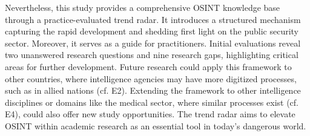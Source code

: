 \documentclass[10pt]{article}
\begin{document}
Nevertheless, this study provides a comprehensive OSINT knowledge base through a practice-evaluated trend radar. It introduces a structured mechanism capturing the rapid development and shedding first light on the public security sector. Moreover, it serves as a guide for practitioners. Initial evaluations reveal two unanswered research questions and nine research gaps, highlighting critical areas for further development. Future research could apply this framework to other countries, where intelligence agencies may have more digitized processes, such as in allied nations (cf. E2). Extending the framework to other intelligence disciplines or domains like the medical sector, where similar processes exist (cf. E4), could also offer new study opportunities. The trend radar aims to elevate OSINT within academic research as an essential tool in today’s dangerous world.

\end{document}
